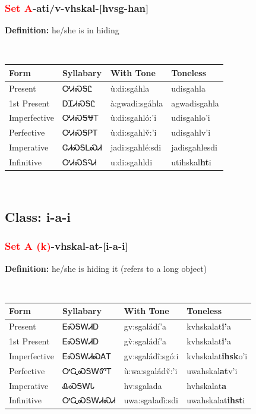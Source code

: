 \subsubsection*{\textcolor{Red}{Set A}{-}ati/v{-}\textbf{vhskal}{-}[hvsg-han]}
\nopagebreak
\textbf{Definition: } he/she is in hiding
\\[0.5em]
\begin{tabularx}{\textwidth}{l X X X}%
\toprule%
\textbf{Form}&\textbf{Syllabary}&\textbf{With Tone}&\textbf{Toneless}\\%
\midrule%
Present&ᎤᏗᏍᎦᏝ&ù:di:sgáhla&udisgahla\\%
1st Present&ᎠᏆᏗᏍᎦᏝ&à:gwadi:sgáhla&agwadisgahla\\%
Imperfective&ᎤᏗᏍᎦᏠᎢ&ù:di:sgahló:’i&udisgahlo{\textquoteright}i\\%
Perfective&ᎤᏗᏍᎦᏢᎢ&ù:di:sgahlv̌:’i&udisgahlv{\textquoteright}i\\%
Imperative&ᏣᏗᏍᎦᏞᏍᏗ&jadi:sgahlé:sdi&jadisgahlesdi\\%
Infinitive&ᎤᏗᏍᎦᎸᏗ&u:di:sgahldi&utihskal\textbf{ht}i\\%
\bottomrule%
\end{tabularx}
\\[1em]
\needspace{3in}
\subsection*{Class: i-a-i}
\nopagebreak
\needspace{2in}
\subsubsection*{\textcolor{Red}{Set A (k)}{-}\textbf{vhskal}{-}at{-}[i-a-i]}
\nopagebreak
\textbf{Definition: } he/she is hiding it (refers to a long object)
\\[0.5em]
\begin{tabularx}{\textwidth}{l X X X}%
\toprule%
\textbf{Form}&\textbf{Syllabary}&\textbf{With Tone}&\textbf{Toneless}\\%
\midrule%
Present&ᎬᏍᎦᎳᏗᎠ&gv:sgaládí’a&kvhskalat\textbf{i'}a\\%
1st Present&ᎬᏍᎦᎳᏗᎠ&gv̀:sgaládí’a&kvhskalat\textbf{i'}a\\%
Imperfective&ᎬᏍᎦᎳᏗᏍᎪᎢ&gv:sgaládî:sgó:i&kvhskalat\textbf{ihsk}o'i\\%
Perfective&ᎤᏩᏍᎦᎳᏛᎢ&ù:wa:sgaládv̌:’i&uwahskal\textbf{at}v'i\\%
Imperative&ᎲᏍᎦᎳᏓ&hv:sgalada&hvhskalat\textbf{a}\\%
Infinitive&ᎤᏩᏍᎦᎳᏗᏍᏗ&uwa:sgaladì:sdi&uwahskalat\textbf{ihst}i\\%
\bottomrule%
\end{tabularx}
\\[1em]
\needspace{3in}
